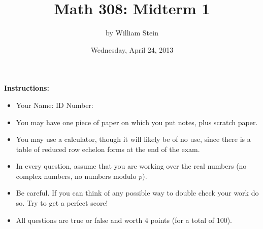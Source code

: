 \documentclass[11pt]{article}
\title{\color{blue}\bf Math 308: Midterm 1}
\date{Wednesday, April 24, 2013}
\author{by William Stein}
\begin{document}
\maketitle
{\noindent\bf\color{red} Instructions:}
\begin{itemize}
\item {\color{blue} Your Name: \underline{\hspace{20em}}   ID Number: \underline{\hspace{10em}}}
\item You may have one piece of paper on which you put notes, plus scratch paper.
\item You may use a calculator, though it will likely be of no use, since there is a table of reduced row echelon forms at the end of the exam.
\item In every question, assume that you are working over the real numbers (no complex numbers, no numbers modulo $p$).
\item Be careful.  If you can think of any possible way to double check your work do so.  Try to get a perfect score!
\item All questions are true or false and worth 4 points (for a total of 100).
\end{itemize}
\end{document}
